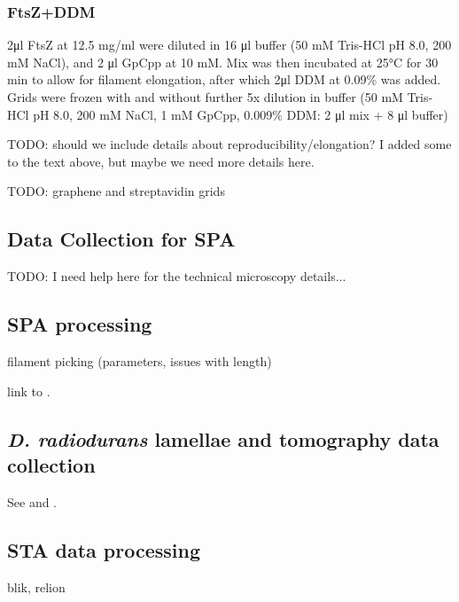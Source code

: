 \subsubsection{FtsZ+DDM}
2μl FtsZ at 12.5 mg/ml were diluted in 16 μl buffer (50 mM Tris-HCl pH 8.0, 200 mM NaCl), and 2 μl GpCpp at 10 mM.
Mix was then incubated at 25°C for 30 min to allow for filament elongation, after which 2μl DDM at 0.09\% was added.
Grids were frozen with and without further 5x dilution in buffer (50 mM Tris-HCl pH 8.0, 200 mM NaCl, 1 mM GpCpp, 0.009\% DDM: 2 μl mix + 8 μl buffer)

TODO: should we include details about reproducibility/elongation? I added some to the text above, but maybe we need more details here.

TODO: graphene and streptavidin grids

\subsection{Data Collection for SPA}

TODO: I need help here for the technical microscopy details...

\subsection{SPA processing}

filament picking (parameters, issues with length)

link to .

\subsection{\textit{D. radiodurans} lamellae and tomography data collection}

See  and .

\subsection{STA data processing}

blik, relion
